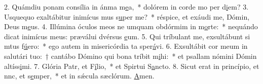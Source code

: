 2. Quámdiu ponam consília in ánma m\uline{e}a,~* dolórem in corde mo per d\uline{i}em?
3. Usquequo exaltábitur inimícus mus s\uline{u}per me?~* réspice, et exáudi me, Dómin, Deus m\uline{e}us.
4. Illúmina óculos meos ne umquam obdórmim in m\uline{o}rte:~* nequándo dicat inimícus meus: præválui dvérsus \uline{e}um.
5. Qui tríbulant me, exsultábunt si mtus f\uline{ú}ero:~* ego autem in misericórdia ta sper\uline{á}vi.
6. Exsultábit cor meum in salutári tuo:~† cantábo Dómino qui bona tríbit m\uline{i}hi:~* et psallam nómini Dómin altíss\uline{i}mi.
7. Glória Patr, et F\uline{í}lio,~* et Spirtui S\uline{a}ncto.
8. Sicut erat in princípio, et nnc, et s\uline{e}mper,~* et in sǽcula sæclórum. \uline{A}men.

